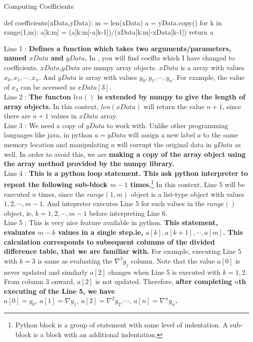 \begin{program}Computing Coefficients
	\begin{python}
		def coefficients(xData,yData):
			m = len(xData)
			a = yData.copy()
			for k in range(1,m):
				a[k:m] = (a[k:m]-a[k-1])/(xData[k:m]-xData[k-1])
			return a
	\end{python}
\end{program}
\begin{commentary}
	Line 1 : \textbf{Defines a function which takes two arguments/parameters, named $xData$ and $yData$.} In \cite[3.2]{kiusalaas}, you will find coeffts which I have changed to coefficients. $xData$,$yData$ are numpy array objects. $xData$ is a array with values $x_0,x_1,\cdots,x_n$. And $yData$ is array with values $y_0,y_1,\cdots,y_n$. For example, the value of $x_3$ can be accessed as $xData[3]$.\\
	
	Line 2 : \textbf{The functon $len()$ is extended by numpy to give the length of array objects.} In this context, $len(xData)$ will return the value $n+1$, since there are $n+1$ values in $xData$ array.\\

	Line 3 : We need a copy of $yData$ to work with. Unlike other programming languages like java, in python $a = yData$ will assign a new label $a$ to the same memory location and manipulating $a$ will corrupt the original data in $yData$ as well. In order to avoid this, we are \textbf{making a copy of the array object using the array method provided by the numpy library.}\\

	Line 4 : \textbf{This is a python loop statement. This ask python interpreter to repeat the following sub-block $m-1$ times.}\footnote{Python block is a group of statement with same level of indentation. A sub-block is a block with an additional indentation.} In this context, Line 5 will be executed $n$ times, since the $range(1,m)$ object is a list-type object with values $1,2,\cdots,m-1$. And intepreter executes Line 5 for each values in the $range()$ object, ie, $k=1,2,\cdots, m-1$ before interpreting Line 6.\\

	Line 5 : This is very nice feature available in python. \textbf{This statement, evaluates $m-k$ values in a single step.ie, $a[k],a[k+1],\cdots,a[m]$. This calculation corresponds to subsequent columns of the divided difference table, that we are familiar with.} For example, executing Line 5 with $k=3$ is same as evaluating the $\nabla^3y_j$ column. Note that the value $a[0]$ is never updated and similarly $a[2]$ changes when Line 5 is executed with $k=1,2$. From column 3 onward, $a[2]$ is not updated. Therefore, \textbf{after completing $n$th executing of the Line 5, we have $a[0] = y_0,\ a[1]=\nabla y_1,\ a[2]=\nabla^2 y_2,\cdots,\ a[n]=\nabla^n y_n$.}\\


\end{commentary}
